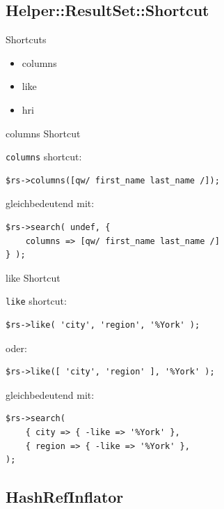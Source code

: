 \subsection{Helper::ResultSet::Shortcut}




\begin{frame}{Shortcuts}
\begin{itemize}
\item columns
\item like
\item hri
\end{itemize}
\end{frame}

\begin{frame}[fragile]{columns Shortcut}

\verb|columns| shortcut:

\begin{lstlisting}
$rs->columns([qw/ first_name last_name /]);
\end{lstlisting}

gleichbedeutend mit:

\begin{lstlisting}
$rs->search( undef, { 
    columns => [qw/ first_name last_name /] 
} );
\end{lstlisting}
\end{frame}

\begin{frame}[fragile]{like Shortcut}

\verb|like| shortcut:

\begin{lstlisting}
$rs->like( 'city', 'region', '%York' );
\end{lstlisting}

oder:

\begin{lstlisting}
$rs->like([ 'city', 'region' ], '%York' );
\end{lstlisting}

gleichbedeutend mit:

\begin{lstlisting}
$rs->search(
    { city => { -like => '%York' },
    { region => { -like => '%York' },
);
\end{lstlisting}
\end{frame}

\subsection{HashRefInflator}

